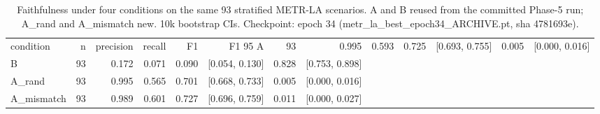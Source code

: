 \begin{table}[t]
\centering
\caption{Faithfulness under four conditions on the same 93 stratified METR-LA scenarios. A and B reused from the committed Phase-5 run; A\_rand and A\_mismatch new. 10k bootstrap CIs. Checkpoint: epoch 34 (metr\_la\_best\_epoch34\_ARCHIVE.pt, sha 4781693e).}
\label{tab:faithfulness}
\begin{tabular}{lrrrrrrr}
\toprule
condition & n & precision & recall & F1 & F1 95%
\midrule
A & 93 & 0.995 & 0.593 & 0.725 & [0.693, 0.755] & 0.005 & [0.000, 0.016] \\
B & 93 & 0.172 & 0.071 & 0.090 & [0.054, 0.130] & 0.828 & [0.753, 0.898] \\
A_rand & 93 & 0.995 & 0.565 & 0.701 & [0.668, 0.733] & 0.005 & [0.000, 0.016] \\
A_mismatch & 93 & 0.989 & 0.601 & 0.727 & [0.696, 0.759] & 0.011 & [0.000, 0.027] \\
\bottomrule
\end{tabular}
\end{table}
